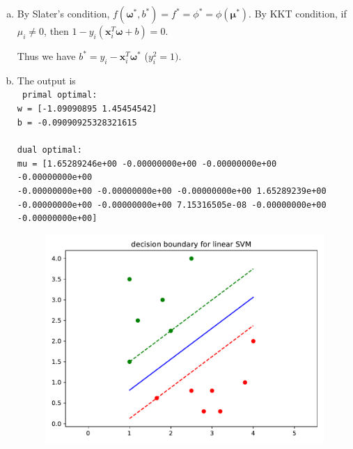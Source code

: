 \documentclass{article}
\def\bold#1{\boldsymbol{#1}}
\def\bw{\boldsymbol{\omega}}
\def\bx{\boldsymbol{x}}
\begin{document}
\begin{enumerate}[(a)]
    \item
		By Slater's condition, $f(\bw^*,b^*)=f^*=\phi^*=\phi(\bold{\mu}^*)$. By KKT condition, if $\mu_i\neq0$, then $1-y_i(\bx_i^T\bw+b)=0$. 

		Thus we have $b^*=y_i-\bx_i^T\bw^*$ ($y_i^2=1)$.
    \item
		The output is\\
		\texttt{
			primal optimal:\\
			w = [-1.09090895  1.45454542]\\
			b = -0.09090925328321615
			\\
			\\
			dual optimal:\\
			mu = [1.65289246e+00 -0.00000000e+00 -0.00000000e+00 -0.00000000e+00\\
 -0.00000000e+00 -0.00000000e+00 -0.00000000e+00  1.65289239e+00\\
 -0.00000000e+00 -0.00000000e+00  7.15316505e-08 -0.00000000e+00\\
 -0.00000000e+00]
		}
		\begin{figure}[H]
			\centering
			\includegraphics[width=0.8\linewidth]{svm.pdf}
		\end{figure}
\end{enumerate}
\end{document}
